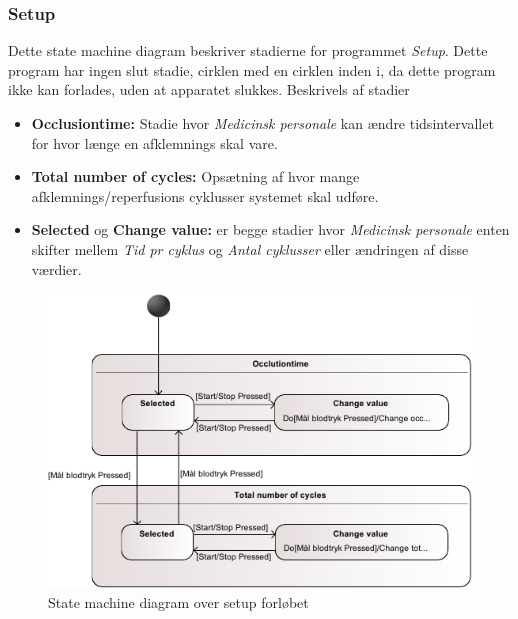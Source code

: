 \subsubsection{Setup}
Dette state machine diagram beskriver stadierne for programmet \textit{Setup}. Dette program har ingen slut stadie, cirklen med en cirklen inden i, da dette program ikke kan forlades, uden at apparatet slukkes. Beskrivels af stadier 
\begin{itemize}
	\item \textbf{Occlusiontime:} Stadie hvor \textit{Medicinsk personale} kan ændre tidsintervallet for hvor længe en afklemnings skal vare. 
	\item \textbf{Total number of cycles:} Opsætning af hvor mange afklemnings/reperfusions cyklusser systemet skal udføre. 
	\item \textbf{Selected} og \textbf{Change value:} er begge stadier hvor \textit{Medicinsk personale} enten skifter mellem \textit{Tid pr cyklus} og \textit{Antal cyklusser} eller ændringen af disse værdier.
	
\end{itemize}
\begin{figure}[H]
	\includegraphics[width=\textwidth]{pdfs/STM_Setup-crop.pdf}
	\caption{State machine diagram over setup forløbet}
\end{figure}

